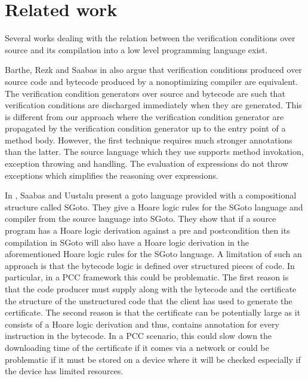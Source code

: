 \section{Related work}\label{pog:relWork}


Several works dealing with the relation between the 
verification conditions over source and its compilation into a low  level  programming  language exist.

Barthe, Rezk and Saabas in \cite{gta05:fast} also argue that verification conditions produced
over source code and bytecode produced by a nonoptimizing compiler   are equivalent.
 The verification condition generators over source and bytecode are such that verification conditions
are discharged immediately when they are generated. This is different from our approach where the
 verification condition generator are propagated by the verification condition generator
 up to the entry point of a method body. However, the first technique requires much stronger
 annotations than the latter. The source language which they use supports method invokation, exception throwing and handling.
The evaluation of expressions do not throw exceptions   which simplifies the reasoning over expressions.



In \cite{SU05CNS}, Saabas and Uustalu present a goto language provided with a compositional structure called SGoto.
They give a Hoare logic rules for the SGoto language and compiler from the source language into SGoto.
They show that if a source program has a Hoare logic derivation
 against a pre and postcondition then its compilation in SGoto will also have a Hoare
 logic derivation in the aforementioned Hoare logic rules for the SGoto language. 
A limitation of such an approach is that the bytecode logic is defined over structured pieces of code. 
In particular, in a  PCC framework this could be problematic. The first reason is that the code producer must supply along with the 
bytecode and the certificate the structure of the unstructured code that the client has used to
 generate the certificate. The second reason is that the certificate  can be potentially large  as it consists of a Hoare logic
 derivation and thus, contains annotation for every instruction in the bytecode. In a PCC scenario, this could slow down the downloading
time of the certificate if it comes via a network or could be problematic if it must be stored on a device  where it will be checked especially if the device
has limited resources.

